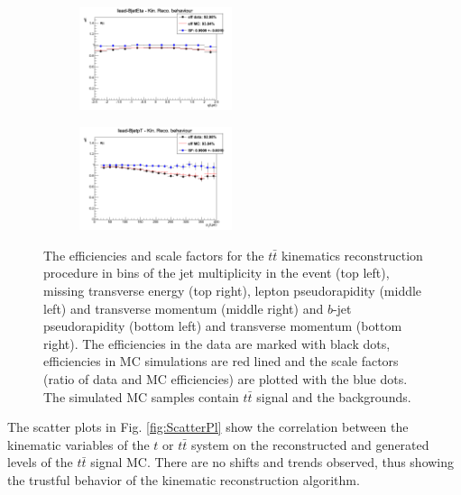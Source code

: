 \begin{figure}[t]
\begin{subfigure}
\end{subfigure}
\begin{subfigure}
  \centering
  \includegraphics[width=0.49\textwidth]{05_kinReco/plots/eff_SF/KinRecoEff_JetEta.png}
\end{subfigure}
\begin{subfigure}
  \centering
  \includegraphics[width=0.49\textwidth]{05_kinReco/plots/eff_SF/KinRecoEff_JetpT.png}
\end{subfigure}
\caption{The efficiencies and scale factors for the $t\bar{t}$ kinematics reconstruction procedure in bins of the jet multiplicity in the event (top left),
         missing transverse energy (top right), lepton pseudorapidity (middle left) and transverse momentum (middle right) and $b$-jet pseudorapidity (bottom left) 
         and transverse momentum (bottom right). The efficiencies in the data 
         are marked with black dots, efficiencies in MC simulations are red lined and the scale factors (ratio of data and MC efficiencies) are plotted with the blue dots.
         The simulated MC samples contain $t\bar{t}$ signal and the backgrounds.}
\label{fig:EffSF}
\end{figure}

The scatter plots in Fig. \ref{fig:ScatterPl} show the correlation between the kinematic variables of the $t$ or $t\bar{t}$ system on the reconstructed and generated
levels of the $t\bar{t}$ signal MC.
There are no shifts and trends observed, thus showing 
the trustful behavior of the kinematic reconstruction algorithm.

